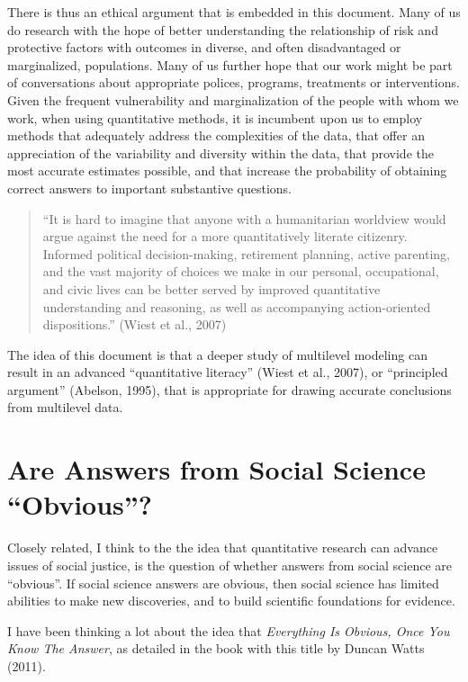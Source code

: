 \documentclass[
  letterpaper,
  DIV=11,
  numbers=noendperiod]{scrreprt}
\begin{document}
There is thus an ethical argument that is embedded in this document.
Many of us do research with the hope of better understanding the
relationship of risk and protective factors with outcomes in diverse,
and often disadvantaged or marginalized, populations. Many of us further
hope that our work might be part of conversations about appropriate
polices, programs, treatments or interventions. Given the frequent
vulnerability and marginalization of the people with whom we work, when
using quantitative methods, it is incumbent upon us to employ methods
that adequately address the complexities of the data, that offer an
appreciation of the variability and diversity within the data, that
provide the most accurate estimates possible, and that increase the
probability of obtaining correct answers to important substantive
questions.

\begin{quote}
``It is hard to imagine that anyone with a humanitarian worldview would
argue against the need for a more quantitatively literate citizenry.
Informed political decision-making, retirement planning, active
parenting, and the vast majority of choices we make in our personal,
occupational, and civic lives can be better served by improved
quantitative understanding and reasoning, as well as accompanying
action-oriented dispositions.'' (Wiest et al., 2007)
\end{quote}

The idea of this document is that a deeper study of multilevel modeling
can result in an advanced ``quantitative literacy'' (Wiest et al.,
2007), or ``principled argument'' (Abelson, 1995), that is appropriate
for drawing accurate conclusions from multilevel data.

\hypertarget{are-answers-from-social-science-obvious}{%
\section{Are Answers from Social Science
``Obvious''?}\label{are-answers-from-social-science-obvious}}

Closely related, I think to the the idea that quantitative research can
advance issues of social justice, is the question of whether answers
from social science are ``obvious''. If social science answers are
obvious, then social science has limited abilities to make new
discoveries, and to build scientific foundations for evidence.

I have been thinking a lot about the idea that \emph{Everything Is
Obvious, Once You Know The Answer}, as detailed in the book with this
title by Duncan Watts (2011).
\end{document}
